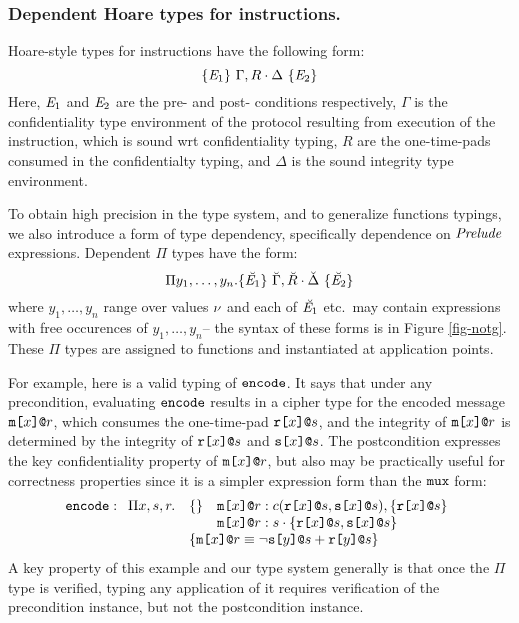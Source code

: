 \subsubsection{Dependent Hoare types for instructions.}

Hoare-style types for instructions have the following form:
$$
\{ \mathit{E}_1 \}\ \Gamma,R \cdot \Delta\ \{ \mathit{E}_2 \}
$$
Here, $\mathit{E}_1$ and $\mathit{E}_2$ are the pre- and post- conditions
respectively, $\Gamma$ is the confidentiality type environment of the
protocol resulting from execution of the instruction, which is sound
wrt confidentiality typing, $R$ are the one-time-pads consumed in the
confidentialty typing, and $\Delta$ is the sound integrity type
environment.

\notgfig

To obtain high precision in the type system, and to generalize
functions typings, we also introduce a form of type dependency,
specifically dependence on $\mathit{Prelude}$ expressions. Dependent
$\Pi$ types have the form:
$$
\Pi y_1,\ldots,y_n . \{ \breve{\mathit{E}_1} \}\ \breve{\Gamma},\breve{R} \cdot \breve{\Delta}\ \{ \breve{\mathit{E}_2} \}
$$
where $y_1,\ldots,y_n$ range over values $\nu$ and each of
$\breve{\mathit{E}_1}$ etc.~may contain expressions with free occurences
of $y_1,\ldots,y_n$-- the syntax of these forms is in Figure
\ref{fig-notg}. These $\Pi$ types are assigned to functions
and instantiated at application points. 

For example, here is a valid typing of $\texttt{encode}$.  It says that
under any precondition, evaluating $\texttt{encode}$ results in a cipher
type for the encoded message $\texttt{m[}x\texttt{]}\texttt{@}r$, which consumes the
one-time-pad $\texttt{r[}x\texttt{]}\texttt{@}s$, and the integrity of $\texttt{m[}x\texttt{]}\texttt{@}r$ is
determined by the integrity of $\texttt{r[}x\texttt{]}\texttt{@}s$ and $\texttt{s[}x\texttt{]}\texttt{@}s$. The
postcondition expresses the key confidentiality property of
$\texttt{m[}x\texttt{]}\texttt{@}r$, but also may be practically useful for correctness
properties since it is a simpler expression form than the $\texttt{mux}$
form:
$$
\ttt{encode} :
\begin{array}[t]{ll}
  \Pi x,s,r . & \{ \} \quad \mx{x}{r} : \cty{\rx{x}{s}}{\sx{x}{s}}, \{ \rx{x}{s} \} \\
  & \phantom{\{ \}} \quad \mx{x}{r} : \ity{s}{\{ \rx{x}{s}, \sx{x}{s} \}} \\
  & \{ \mx{x}{r} \eop \neg\sx{y}{s} \fplus \rx{y}{s} \}
\end{array}
$$
A key property of this example and our type system generally is that once
the $\Pi$ type is verified, typing any application of it requires verification
of the precondition instance, but not the postcondition instance.

